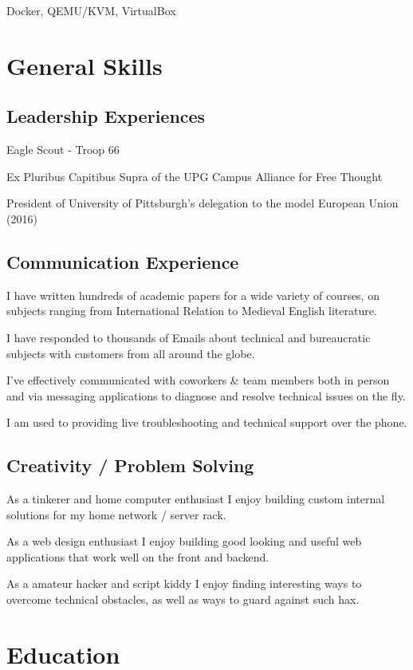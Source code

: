 \documentclass{article}
\begin{document}
Docker, QEMU/KVM, VirtualBox

\section{General Skills}

\subsection{Leadership Experiences}

Eagle Scout - Troop 66

Ex Pluribus Capitibus Supra of the UPG Campus Alliance for Free Thought

President of University of Pittsburgh's delegation to the model European Union (2016)

\subsection{Communication Experience}

I have written hundreds of academic papers for a wide variety of courses, on
subjects ranging from International Relation to Medieval English literature.

I have responded to thousands of Emails about technical and bureaucratic
subjects with customers from all around the globe.

I've effectively communicated with coworkers \& team members both in person and
via messaging applications to diagnose and resolve technical issues on the fly.

I am used to providing live troubleshooting and technical support over the
phone. 

\subsection{Creativity / Problem Solving}

As a tinkerer and home computer enthusiast I enjoy building custom internal
solutions for my home network / server rack.

As a web design enthusiast I enjoy building good looking and useful web
applications that work well on the front and backend.

As a amateur hacker and script kiddy I enjoy finding interesting ways to
overcome technical obstacles, as well as ways to guard against such hax.

\section{Education}
\end{document}
